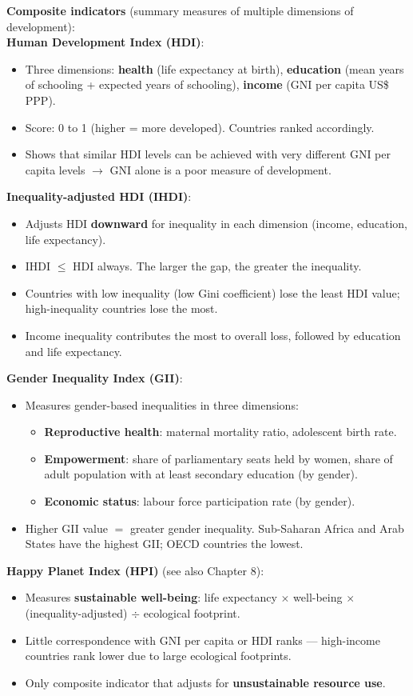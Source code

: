 \textbf{Composite indicators} (summary measures of multiple dimensions of development):
\\
\textbf{Human Development Index (HDI)}:
\begin{itemize}
  \item Three dimensions: \textbf{health} (life expectancy at birth), \textbf{education} (mean years of schooling + expected years of schooling), \textbf{income} (GNI per capita US\$ PPP).
  \item Score: 0 to 1 (higher = more developed). Countries ranked accordingly.
  \item Shows that similar HDI levels can be achieved with very different GNI per capita levels $\to$ GNI alone is a poor measure of development.
\end{itemize}
\textbf{Inequality-adjusted HDI (IHDI)}:
\begin{itemize}
  \item Adjusts HDI \textbf{downward} for inequality in each dimension (income, education, life expectancy).
  \item IHDI $\leq$ HDI always. The larger the gap, the greater the inequality.
  \item Countries with low inequality (low Gini coefficient) lose the least HDI value; high-inequality countries lose the most.
  \item Income inequality contributes the most to overall loss, followed by education and life expectancy.
\end{itemize}
\textbf{Gender Inequality Index (GII)}:
\begin{itemize}
  \item Measures gender-based inequalities in three dimensions:
  \begin{itemize}
    \item \textbf{Reproductive health}: maternal mortality ratio, adolescent birth rate.
    \item \textbf{Empowerment}: share of parliamentary seats held by women, share of adult population with at least secondary education (by gender).
    \item \textbf{Economic status}: labour force participation rate (by gender).
  \end{itemize}
  \item Higher GII value $=$ greater gender inequality. Sub-Saharan Africa and Arab States have the highest GII; OECD countries the lowest.
\end{itemize}
\textbf{Happy Planet Index (HPI)} (see also Chapter 8):
\begin{itemize}
  \item Measures \textbf{sustainable well-being}: life expectancy $\times$ well-being $\times$ (inequality-adjusted) $\div$ ecological footprint.
  \item Little correspondence with GNI per capita or HDI ranks --- high-income countries rank lower due to large ecological footprints.
  \item Only composite indicator that adjusts for \textbf{unsustainable resource use}.
\end{itemize}
